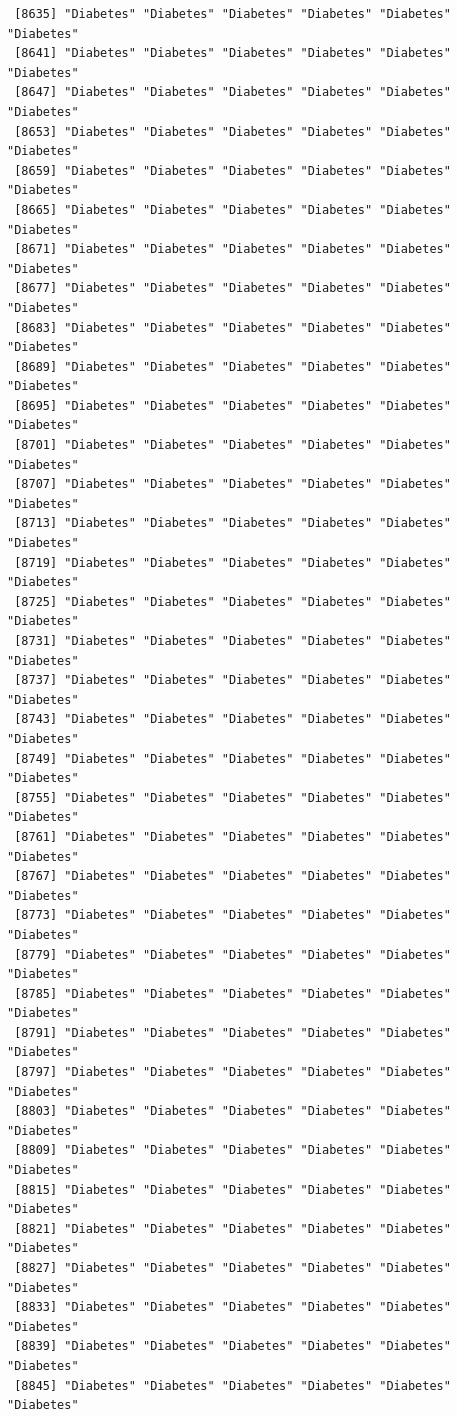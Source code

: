 \documentclass[
  letterpaper,
  DIV=11,
  numbers=noendperiod]{scrartcl}
\begin{document}
\begin{verbatim}
 [8635] "Diabetes" "Diabetes" "Diabetes" "Diabetes" "Diabetes" "Diabetes"
 [8641] "Diabetes" "Diabetes" "Diabetes" "Diabetes" "Diabetes" "Diabetes"
 [8647] "Diabetes" "Diabetes" "Diabetes" "Diabetes" "Diabetes" "Diabetes"
 [8653] "Diabetes" "Diabetes" "Diabetes" "Diabetes" "Diabetes" "Diabetes"
 [8659] "Diabetes" "Diabetes" "Diabetes" "Diabetes" "Diabetes" "Diabetes"
 [8665] "Diabetes" "Diabetes" "Diabetes" "Diabetes" "Diabetes" "Diabetes"
 [8671] "Diabetes" "Diabetes" "Diabetes" "Diabetes" "Diabetes" "Diabetes"
 [8677] "Diabetes" "Diabetes" "Diabetes" "Diabetes" "Diabetes" "Diabetes"
 [8683] "Diabetes" "Diabetes" "Diabetes" "Diabetes" "Diabetes" "Diabetes"
 [8689] "Diabetes" "Diabetes" "Diabetes" "Diabetes" "Diabetes" "Diabetes"
 [8695] "Diabetes" "Diabetes" "Diabetes" "Diabetes" "Diabetes" "Diabetes"
 [8701] "Diabetes" "Diabetes" "Diabetes" "Diabetes" "Diabetes" "Diabetes"
 [8707] "Diabetes" "Diabetes" "Diabetes" "Diabetes" "Diabetes" "Diabetes"
 [8713] "Diabetes" "Diabetes" "Diabetes" "Diabetes" "Diabetes" "Diabetes"
 [8719] "Diabetes" "Diabetes" "Diabetes" "Diabetes" "Diabetes" "Diabetes"
 [8725] "Diabetes" "Diabetes" "Diabetes" "Diabetes" "Diabetes" "Diabetes"
 [8731] "Diabetes" "Diabetes" "Diabetes" "Diabetes" "Diabetes" "Diabetes"
 [8737] "Diabetes" "Diabetes" "Diabetes" "Diabetes" "Diabetes" "Diabetes"
 [8743] "Diabetes" "Diabetes" "Diabetes" "Diabetes" "Diabetes" "Diabetes"
 [8749] "Diabetes" "Diabetes" "Diabetes" "Diabetes" "Diabetes" "Diabetes"
 [8755] "Diabetes" "Diabetes" "Diabetes" "Diabetes" "Diabetes" "Diabetes"
 [8761] "Diabetes" "Diabetes" "Diabetes" "Diabetes" "Diabetes" "Diabetes"
 [8767] "Diabetes" "Diabetes" "Diabetes" "Diabetes" "Diabetes" "Diabetes"
 [8773] "Diabetes" "Diabetes" "Diabetes" "Diabetes" "Diabetes" "Diabetes"
 [8779] "Diabetes" "Diabetes" "Diabetes" "Diabetes" "Diabetes" "Diabetes"
 [8785] "Diabetes" "Diabetes" "Diabetes" "Diabetes" "Diabetes" "Diabetes"
 [8791] "Diabetes" "Diabetes" "Diabetes" "Diabetes" "Diabetes" "Diabetes"
 [8797] "Diabetes" "Diabetes" "Diabetes" "Diabetes" "Diabetes" "Diabetes"
 [8803] "Diabetes" "Diabetes" "Diabetes" "Diabetes" "Diabetes" "Diabetes"
 [8809] "Diabetes" "Diabetes" "Diabetes" "Diabetes" "Diabetes" "Diabetes"
 [8815] "Diabetes" "Diabetes" "Diabetes" "Diabetes" "Diabetes" "Diabetes"
 [8821] "Diabetes" "Diabetes" "Diabetes" "Diabetes" "Diabetes" "Diabetes"
 [8827] "Diabetes" "Diabetes" "Diabetes" "Diabetes" "Diabetes" "Diabetes"
 [8833] "Diabetes" "Diabetes" "Diabetes" "Diabetes" "Diabetes" "Diabetes"
 [8839] "Diabetes" "Diabetes" "Diabetes" "Diabetes" "Diabetes" "Diabetes"
 [8845] "Diabetes" "Diabetes" "Diabetes" "Diabetes" "Diabetes" "Diabetes"

\end{verbatim}
\end{document}
